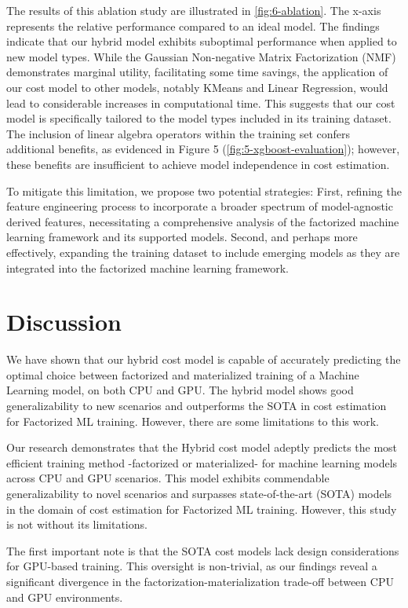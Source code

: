 The results of this ablation study are illustrated in \autoref{fig:6-ablation}. The x-axis represents the relative performance compared to an ideal model. The findings indicate that our hybrid model exhibits suboptimal performance when applied to new model types. While the Gaussian Non-negative Matrix Factorization (NMF) demonstrates marginal utility, facilitating some time savings, the application of our cost model to other models, notably KMeans and Linear Regression, would lead to considerable increases in computational time. This suggests that our cost model is specifically tailored to the model types included in its training dataset. The inclusion of linear algebra operators within the training set confers additional benefits, as evidenced in Figure 5 (\autoref{fig:5-xgboost-evaluation}); however, these benefits are insufficient to achieve model independence in cost estimation.

To mitigate this limitation, we propose two potential strategies: First, refining the feature engineering process to incorporate a broader spectrum of model-agnostic derived features, necessitating a comprehensive analysis of the factorized machine learning framework and its supported models. Second, and perhaps more effectively, expanding the training dataset to include emerging models as they are integrated into the factorized machine learning framework.

\section{Discussion}
\label{sec:eval-discussion}
We have shown that our hybrid cost model is capable of accurately predicting the optimal choice between factorized and materialized training of a Machine Learning model, on both CPU and GPU. The hybrid model shows good generalizability to new scenarios and outperforms the SOTA in cost estimation for Factorized ML training. However, there are some limitations to this work.

Our research demonstrates that the Hybrid cost model adeptly predicts the most efficient training method -factorized or materialized- for machine learning models across CPU and GPU scenarios. This model exhibits commendable generalizability to novel scenarios and surpasses state-of-the-art (SOTA) models in the domain of cost estimation for Factorized ML training. However, this study is not without its limitations.

The first important note is that the SOTA cost models lack design considerations for GPU-based training. This oversight is non-trivial, as our findings reveal a significant divergence in the factorization-materialization trade-off between CPU and GPU environments.

